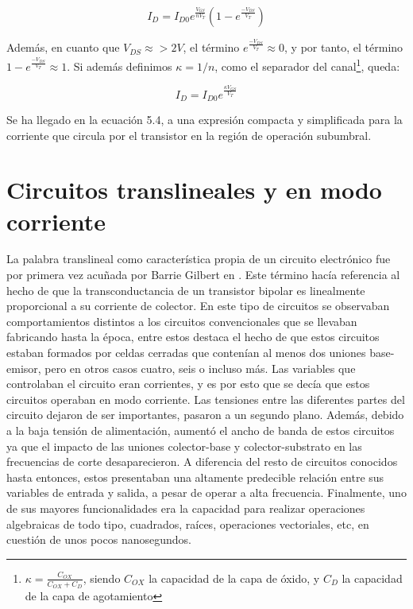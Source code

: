 \begin{equation}
I_D=I_{D0}e^{\frac{V_{GS}}{nV_T}}(1-e^{\frac{-V_{DS}}{V_T}})
\end{equation}

Además, en cuanto que $V_{DS}\approx >2 V$, el término $e^{\frac{-V_{DS}}{V_T}}\approx 0$, y por tanto, el término $1-e^{\frac{-V_{DS}}{V_T}}\approx 1$. Si además definimos $\kappa =1/n$, como el separador del canal\footnote{$\kappa =\frac{C_{OX}}{C_{OX}+C_D}$, siendo $C_{OX}$ la capacidad de la capa de óxido, y $C_D$ la capacidad de la capa de agotamiento}, queda:

\begin{equation}
I_D=I_{D0}e^{\frac{\kappa V_{GS}}{V_T}}
\end{equation}

Se ha llegado en la ecuación 5.4, a una expresión compacta y simplificada para la corriente que circula por el transistor en la región de operación subumbral.

\section{Circuitos translineales y en modo corriente}

La palabra translineal como característica propia de un circuito electrónico fue por primera vez acuñada por Barrie Gilbert en \cite{gilbert1996translinear}. Este término hacía referencia al hecho de que la transconductancia de un transistor bipolar es linealmente proporcional a su corriente de colector. En este tipo de circuitos se observaban comportamientos distintos a los circuitos convencionales que se llevaban fabricando hasta la época, entre estos destaca el hecho de que estos circuitos estaban formados por celdas cerradas que contenían al menos dos uniones base-emisor, pero en otros casos cuatro, seis o incluso más. Las variables que controlaban el circuito eran corrientes, y es por esto que se decía que estos circuitos operaban en modo corriente. Las tensiones entre las diferentes partes del circuito dejaron de ser importantes, pasaron a un segundo plano. Además, debido a la baja tensión de alimentación, aumentó el ancho de banda de estos circuitos ya que el impacto de las uniones colector-base y colector-substrato en las frecuencias de corte desaparecieron. A diferencia del resto de circuitos conocidos hasta entonces, estos presentaban una altamente predecible relación entre sus variables de entrada y salida, a pesar de operar a alta frecuencia. Finalmente, uno de sus mayores funcionalidades era la capacidad para realizar operaciones algebraicas de todo tipo, cuadrados, raíces, operaciones vectoriales, etc, en cuestión de unos pocos nanosegundos. 


